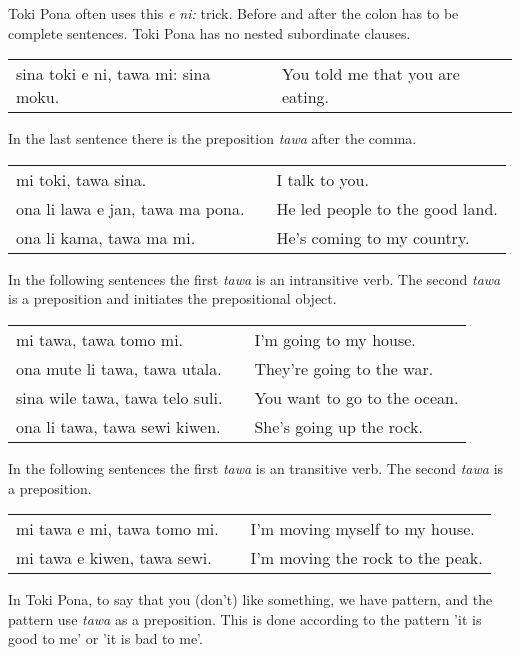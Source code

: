 Toki Pona often uses this \textit{e ni:} trick. 
Before and after the colon has to be complete sentences. 
Toki Pona has no nested subordinate clauses.

\begin{supertabular}{p{5,5cm}|ll}
sina toki e ni, tawa mi: sina moku. && You told me that you are eating. \\
\end{supertabular} 

%
In the last sentence there is the preposition \textit{tawa} after the comma. 

\begin{supertabular}{p{5,5cm}|ll}
mi toki, tawa sina. && I talk to you. \\
ona li lawa e jan, tawa ma pona. && He led people to the good land. \\
ona li kama, tawa ma mi. && He's coming to my country. \\
\end{supertabular} 

In the following sentences the first \textit{tawa} is an intransitive verb.
The second \textit{tawa} is a preposition and initiates the prepositional object. 

\begin{supertabular}{p{5,5cm}|ll}
mi tawa, tawa tomo mi. && I'm going to my house. \\
ona mute li tawa, tawa utala. && They're going to the war. \\
sina wile tawa, tawa telo suli. && You want to go to the ocean. \\
ona li tawa, tawa sewi kiwen. && She's going up the rock. \\
\end{supertabular} 

In the following sentences the first \textit{tawa} is an transitive verb.
The second \textit{tawa} is a preposition.

\begin{supertabular}{p{5,5cm}|ll}
mi tawa e mi, tawa tomo mi. && I'm moving myself to my house. \\
mi tawa e kiwen, tawa sewi. && I'm moving the rock to the peak. \\
\end{supertabular} 

%
In Toki Pona, to say that you (don't) like something, we have pattern, and the pattern use \textit{tawa} as a preposition. 
This is done according to the pattern 'it is good to me' or 'it is bad to me'. 

